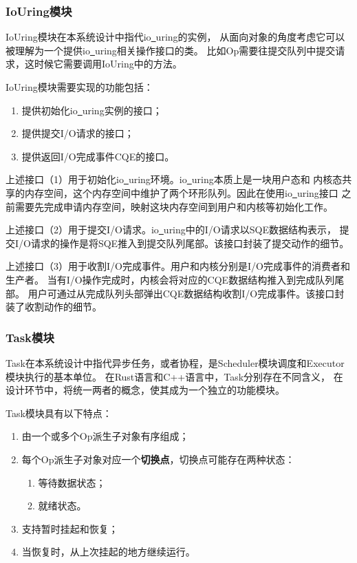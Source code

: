 \documentclass[supercite]{HustGraduPaper}
\theoremstyle{definition}
\begin{document}
\subsubsection{IoUring模块}

IoUring模块在本系统设计中指代io\underline{~}uring的实例，
从面向对象的角度考虑它可以被理解为一个提供io\underline{~}uring相关操作接口的类。
比如Op需要往提交队列中提交请求，这时候它需要调用IoUring中的方法。\par

IoUring模块需要实现的功能包括：

\begin{enumerate}[label={(\arabic*)}]
  \item 提供初始化io\underline{~}uring实例的接口；
  \item 提供提交I/O请求的接口；
  \item 提供返回I/O完成事件CQE的接口。
\end{enumerate}

上述接口（1）用于初始化io\underline{~}uring环境。io\underline{~}uring本质上是一块用户态和
内核态共享的内存空间，这个内存空间中维护了两个环形队列。因此在使用io\underline{~}uring接口
之前需要先完成申请内存空间，映射这块内存空间到用户和内核等初始化工作。\par

上述接口（2）用于提交I/O请求。io\underline{~}uring中的I/O请求以SQE数据结构表示，
提交I/O请求的操作是将SQE推入到提交队列尾部。该接口封装了提交动作的细节。\par

上述接口（3）用于收割I/O完成事件。用户和内核分别是I/O完成事件的消费者和生产者。
当有I/O操作完成时，内核会将对应的CQE数据结构推入到完成队列尾部。
用户可通过从完成队列头部弹出CQE数据结构收割I/O完成事件。该接口封装了收割动作的细节。\par

\subsubsection{Task模块}

Task在本系统设计中指代异步任务，或者协程，是Scheduler模块调度和Executor模块执行的基本单位。
在Rust语言和C++语言中，Task分别存在不同含义，
在设计环节中，将统一两者的概念，使其成为一个独立的功能模块。\par

Task模块具有以下特点：
\begin{enumerate}[label={(\arabic*)}]
  \item 由一个或多个Op派生子对象有序组成；
  \item 每个Op派生子对象对应一个\textbf{切换点}，切换点可能存在两种状态：
    \begin{enumerate}
      \item 等待数据状态；
      \item 就绪状态。
    \end{enumerate}
  \item 支持暂时挂起和恢复；
  \item 当恢复时，从上次挂起的地方继续运行。
\end{enumerate}
\end{document}
